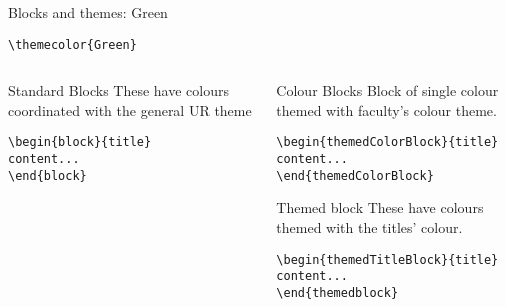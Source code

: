 \begingroup
{}
\begin{frame}[fragile]{Blocks and themes: Green}
    \begin{center}\verb|\themecolor{Green}|\end{center}
\begin{columns} %
\begin{column}{0.3\textwidth}
\begin{block}{Standard Blocks}
These have colours coordinated with the general UR theme
\begin{verbatim}
\begin{block}{title}
content...
\end{block}
\end{verbatim}
\end{block}
\end{column}
\begin{column}{0.7\textwidth}
\begin{themedColorBlock}{Colour Blocks}
Block of single colour themed with faculty's colour theme.
\small
\begin{verbatim}
\begin{themedColorBlock}{title}
content...
\end{themedColorBlock}
\end{verbatim}
\end{themedColorBlock}
\begin{themedTitleBlock} {Themed block}
These have colours themed with the titles' colour.
\small
\begin{verbatim}
\begin{themedTitleBlock}{title}
content...
\end{themedblock}
\end{verbatim}
\end{themedTitleBlock}
\end{column}
\end{columns}
\end{frame}
\endgroup


